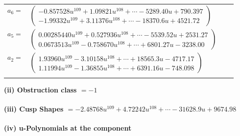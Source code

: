 \documentclass[1p]{elsarticle_modified}
\theoremstyle{definition}
\begin{document}
\begin{tabular}{m{7pt} m{180pt} m{7pt} m{180pt} }
\flushright $a_{6}=$&$\begin{pmatrix}-0.857528 u^{109}+1.09821 u^{108}+\cdots-5289.40 u+790.397\\-1.99332 u^{109}+3.11376 u^{108}+\cdots-18370.6 u+4521.72\end{pmatrix}$ \\
\flushright $a_{5}=$&$\begin{pmatrix}0.00285440 u^{109}+0.527936 u^{108}+\cdots-5539.52 u+2531.27\\0.0673513 u^{109}-0.758670 u^{108}+\cdots+6801.27 u-3238.00\end{pmatrix}$ \\
\flushright $a_{2}=$&$\begin{pmatrix}1.93960 u^{109}-3.10158 u^{108}+\cdots+18565.3 u-4717.17\\1.11994 u^{109}-1.36855 u^{108}+\cdots+6391.16 u-748.098\end{pmatrix}$\\&\end{tabular}
\flushleft \textbf{(ii) Obstruction class $= -1$}\\~\\
\flushleft \textbf{(iii) Cusp Shapes $= -2.48768 u^{109}+4.72242 u^{108}+\cdots-31628.9 u+9674.98$}\\~\\
\newpage\renewcommand{\arraystretch}{1}
\flushleft \textbf{(iv) u-Polynomials at the component}\newline \\
\end{document}
